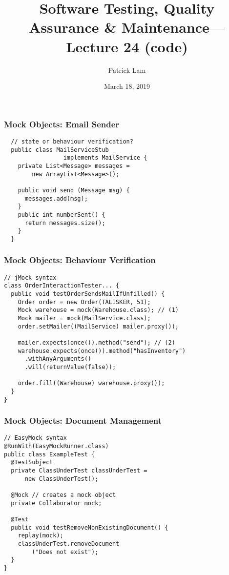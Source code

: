 \documentclass{beamer}
\title{Software Testing, Quality Assurance \& Maintenance---Lecture 24 (code)}
\author{Patrick Lam}
\date{March 18, 2019}
\newenvironment{changemargin}[1]{%
  \begin{list}{}{%
    \setlength{\topsep}{0pt}%
    \setlength{\leftmargin}{#1}%
    \setlength{\rightmargin}{1em}
    \setlength{\listparindent}{\parindent}%
    \setlength{\itemindent}{\parindent}%
    \setlength{\parsep}{\parskip}%
  }%
  \item[]}{\end{list}}
\begin{document}
\begin{frame}
  \titlepage
\end{frame}

\begin{frame}[fragile]
  \frametitle{Mock Objects: Email Sender}
  \begin{changemargin}{1cm}
{\small
  \begin{lstlisting}
  // state or behaviour verification?
  public class MailServiceStub
                 implements MailService {
    private List<Message> messages =
        new ArrayList<Message>();
    
    public void send (Message msg) {
      messages.add(msg);
    }
    public int numberSent() {
      return messages.size();
    }
  }     
\end{lstlisting}
}
  \end{changemargin}
\end{frame}

\begin{frame}[fragile]
  \frametitle{Mock Objects: Behaviour Verification}
  \begin{changemargin}{1cm}
{\small
  \begin{lstlisting}
// jMock syntax
class OrderInteractionTester... {
  public void testOrderSendsMailIfUnfilled() {
    Order order = new Order(TALISKER, 51);
    Mock warehouse = mock(Warehouse.class); // (1)
    Mock mailer = mock(MailService.class);
    order.setMailer((MailService) mailer.proxy());

    mailer.expects(once()).method("send"); // (2)
    warehouse.expects(once()).method("hasInventory")
      .withAnyArguments()
      .will(returnValue(false));

    order.fill((Warehouse) warehouse.proxy());
  }
}    
\end{lstlisting}
}
  \end{changemargin}
\end{frame}

\begin{frame}[fragile]
  \frametitle{Mock Objects: Document Management}
  \begin{changemargin}{1cm}
{\small
  \begin{lstlisting}
// EasyMock syntax
@RunWith(EasyMockRunner.class)
public class ExampleTest {
  @TestSubject
  private ClassUnderTest classUnderTest =
      new ClassUnderTest();

  @Mock // creates a mock object
  private Collaborator mock;

  @Test
  public void testRemoveNonExistingDocument() {
    replay(mock);
    classUnderTest.removeDocument
        ("Does not exist");
  }
} 
\end{lstlisting}
}
  \end{changemargin}
\end{frame}
\end{document}

